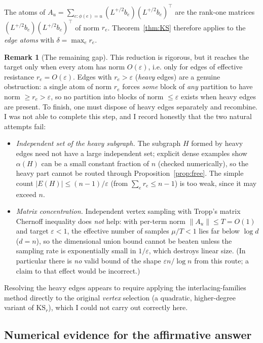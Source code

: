 \documentclass[12pt]{article}
\theoremstyle{definition}
\newtheorem{remark}{Remark}
\newcommand{\eps}{\varepsilon}
\begin{document}
The atoms of $A_u=\sum_{e:\phi(e)=u}(L^{+/2}b_e)(L^{+/2}b_e)^\top$ are the rank-one matrices
$(L^{+/2}b_e)(L^{+/2}b_e)^\top$ of norm $r_e$. Theorem~\ref{thm:KS} therefore applies to the
\emph{edge atoms} with $\delta=\max_e r_e$.

\begin{remark}[The remaining gap]\label{rem:gap}
This reduction is rigorous, but it reaches the target only when every atom has norm $O(\eps)$, i.e.
only for edges of effective resistance $r_e=O(\eps)$. Edges with $r_e>\eps$ (\emph{heavy} edges) are a
genuine obstruction: a single atom of norm $r_e$ forces \emph{some} block of \emph{any} partition to
have norm $\ge r_e>\eps$, so no partition into blocks of norm $\le\eps$ exists when heavy edges are
present. To finish, one must dispose of heavy edges separately and recombine. I was not able to
complete this step, and I record honestly that the two natural attempts fail:
\begin{itemize}
\item \emph{Independent set of the heavy subgraph.} The subgraph $H$ formed by heavy edges need not
have a large independent set; explicit dense examples show $\alpha(H)$ can be a small constant fraction
of $n$ (checked numerically), so the heavy part cannot be routed through Proposition~\ref{prop:free}.
The simple count $|E(H)|\le(n-1)/\eps$ (from $\sum_e r_e\le n-1$) is too weak, since it may exceed $n$.
\item \emph{Matrix concentration.} Independent vertex sampling with Tropp's matrix Chernoff inequality
does \emph{not} help: with per-term norm $\|A_u\|\le T=O(1)$ and target $\eps<1$, the effective number
of samples $\mu/T<1$ lies far below $\log d$ ($d=n$), so the dimensional union bound cannot be beaten
unless the sampling rate is exponentially small in $1/\eps$, which destroys linear size. (In
particular there is \emph{no} valid bound of the shape $\eps n/\log n$ from this route; a claim to that
effect would be incorrect.)
\end{itemize}
Resolving the heavy edges appears to require applying the interlacing-families method directly to the
original \emph{vertex} selection (a quadratic, higher-degree variant of $\mathrm{KS}_r$), which I could
not carry out correctly here.
\end{remark}

\subsection*{Numerical evidence for the affirmative answer}
\end{document}
